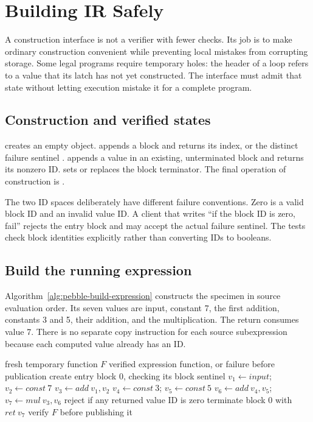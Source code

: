 \chapter{Building IR Safely}
\label{ch:pebble-builders}

A construction interface is not a verifier with fewer checks.
Its job is to make ordinary construction convenient while preventing local mistakes from corrupting storage.
Some legal programs require temporary holes: the header of a loop refers to a value that its latch has not yet constructed.
The interface must admit that state without letting execution mistake it for a complete program.

\section{Construction and verified states}
\label{sec:pebble-building-state}
 creates an empty object.
 appends a block and returns its index, or the distinct failure sentinel .
 appends a value in an existing, unterminated block and returns its nonzero ID.
 sets or replaces the block terminator.
The final operation of construction is .

The two ID spaces deliberately have different failure conventions.
Zero is a valid block ID and an invalid value ID.
A client that writes \enquote{if the block ID is zero, fail} rejects the entry block and may accept the actual failure sentinel.
The tests check block identities explicitly rather than converting IDs to booleans.

\section{Build the running expression}
\label{sec:pebble-build-example}
Algorithm~\ref{alg:pebble-build-expression} constructs the specimen in source evaluation order.
Its seven values are input, constant 7, the first addition, constants 3 and 5, their addition, and the multiplication.
The return consumes value 7.
There is no separate copy instruction for each source subexpression because each computed value already has an ID.

\begin{algorithm}[htbp]
\caption{Building the running expression with checked allocation.}
\label{alg:pebble-build-expression}
\begin{pseudocode}
\Require fresh temporary function $F$
\Ensure verified expression function, or failure before publication
\State create entry block 0, checking its block sentinel
\State $v_1\gets input$; $v_2\gets const\ 7$
\State $v_3\gets add\ v_1,v_2$
\State $v_4\gets const\ 3$; $v_5\gets const\ 5$
\State $v_6\gets add\ v_4,v_5$; $v_7\gets mul\ v_3,v_6$
\State reject if any returned value ID is zero
\State terminate block 0 with $ret\ v_7$
\State verify $F$ before publishing it
\end{pseudocode}
\end{algorithm}

